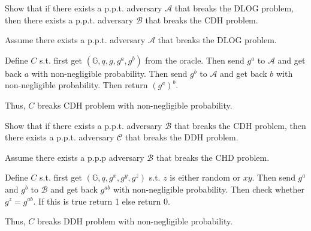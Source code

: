 \documentclass[12pt, letterpaper]{article}
\begin{document}
\qh
\begin{subproblem}{}
    Show that if there exists a p.p.t. adversary $\mathcal{A}$ that breaks the DLOG problem, then there exists a p.p.t. adversary $\mathcal{B}$ that breaks the CDH problem.
\end{subproblem}
\begin{problemproof}
    Assume there exists a p.p.t. adversary $\mathcal{A}$ that breaks the DLOG problem.

    Define $C$ s.t. first get $(\mathbb{G},q,g,g^a,g^b)$ from the oracle. Then send $g^a$ to $\mathcal{A}$ and get back $a$ with non-negligible probability. Then send $g^b$ to $\mathcal{A}$  and get back $b$ with non-negligible probability. Then return $(g^a)^b$.

    Thus, $C$ breaks CDH problem with non-negligible probability.
\end{problemproof}

\begin{subproblem}{}
    Show that if there exists a p.p.t. adversary $\mathcal{B}$ that breaks the CDH problem, then there exists a p.p.t. adversary $\mathcal{C}$ that breaks the DDH problem.
\end{subproblem}
\begin{problemproof}
    Assume there exists a p.p.p adversary $\mathcal{B}$ that breaks the CHD problem.

    Define $C$ s.t. first get $(\mathbb{G},q,g^x,g^y,g^z)$ s.t. $z$ is either random or $xy$. Then send $g^a$ and $g^b$ to $\mathcal{B}$ and get back $g^{ab}$ with non-negligible probability. Then check whether $g^z=g^{ab}$. If this is true return 1 else return 0.

    Thus, $C$ breaks DDH problem with non-negligible probability.
\end{problemproof}
\end{document}
